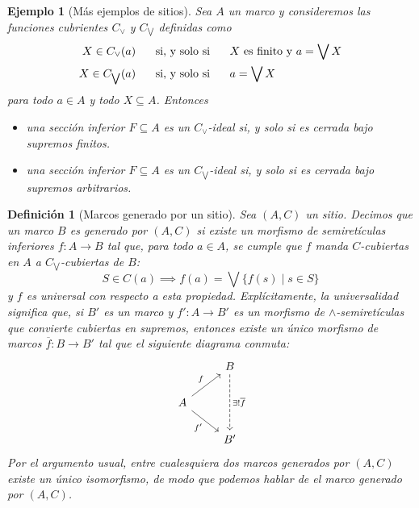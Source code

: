 \documentclass[12pt,letterpaper,titlepage]{article}
\newtheorem*{defn}{Definición}
\newtheorem*{exa}{Ejemplo}
\theoremstyle{definition}
\renewcommand\sup{\vee}
\newcommand\Sup{\bigvee}
\newcommand\ol[1]{\overline{#1}}
\renewcommand\inf{\wedge}
\newcommand\ssi{\hspace{5mm}\text{ si, y solo si }\hspace{5mm}}
\newcommand\<{\langle}
\renewcommand\>{\rangle}
\begin{document}
\begin{exa}[Más ejemplos de sitios]
    Sea $A$ un marco y consideremos las funciones cubrientes
    $C_\sup$ y $C_{\Sup}$ definidas como
    \begin{align*}
        X\in C_\sup(a)
        &\ssi
        \text{$X$ es finito y } a=\Sup X \\
        X\in C_{\Sup}(a)
        &\ssi
        a=\Sup X 
    \end{align*}
    para todo $a\in A$ y todo $X\subseteq A$.
    Entonces
    \begin{itemize}
        \item
        una sección inferior $F\subseteq A$ es un
        $C_\sup$-ideal si, y solo si es cerrada bajo supremos
        finitos.
        \item
        una sección inferior $F\subseteq A$ es un
        $C_{\Sup}$-ideal si, y solo si es cerrada bajo supremos
        arbitrarios.
    \end{itemize}
\end{exa}

\begin{defn}[Marcos generado por un sitio]
    Sea $(A,C)$ un sitio.
    Decimos que un marco $B$ es generado por $(A,C)$
    si existe un morfismo de semiretículas inferiores
    $f:A\to B$ tal que, para todo $a\in A$, se cumple
    que $f$ manda $C$-cubiertas en $A$ a $C_{\Sup}$-cubiertas
    de $B$:
    \begin{equation*}
        S\in C(a) \implies f(a) = \Sup\{f(s)\mid s\in S\}
    \end{equation*}
    y $f$ es universal con respecto a esta propiedad.
    Explícitamente, la universalidad significa que,
    si $B'$ es un marco y $f':A\to B'$ es un morfismo
    de $\inf$-semiretículas
    que convierte cubiertas en supremos,
    entonces existe un único morfismo de marcos
    $\ol{f}:B\to B'$ tal que el siguiente diagrama conmuta:
    \[
        \begin{tikzcd}[ampersand replacement=\&]
            \& B \arrow[dd, "\exists!\overline{f}", dashed] \\
            A \arrow[ru, "f"] \arrow[rd, "f'"'] \& \\
            \& B'                                          
        \end{tikzcd}
    \]
    Por el argumento usual, entre cualesquiera dos
    marcos generados por $(A,C)$ existe un único isomorfismo,
    de modo que podemos hablar de \emph{el} marco generado
    por $(A,C)$.
\end{defn}
\end{document}
